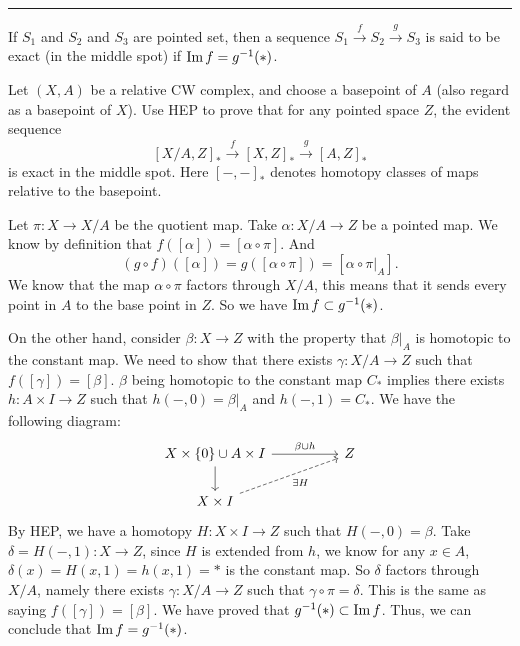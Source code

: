 \documentclass[a4paper, 12pt]{article}
\begin{document}
\noindent\rule{7in}{2.8pt}
\begin{problem}{2}
If \(S_1\) and \(S_2\) and \(S_3\) are pointed set, then a sequence \(S_1\xrightarrow{f}S_2\xrightarrow{g}S_3\) is said to be exact (in the middle spot) if \(\text{Im}\, f=g^{-1}(*)\). 

Let \((X,A)\) be a relative CW complex, and choose a basepoint of \(A\) (also regard as a basepoint of \(X\)). Use HEP to prove that for any pointed space \(Z\), the evident sequence 
\[[X/A,Z]_*\xrightarrow{f} [X,Z]_*\xrightarrow{g} [A,Z]_*\] 
is exact in the middle spot. Here \([-,-]_*\) denotes homotopy classes of maps relative to the basepoint.
\end{problem}
\begin{solution}
Let \(\pi:X\rightarrow X/A\) be the quotient map. Take \(\alpha:X/A\rightarrow Z\) be a pointed map. We know by definition that \(f([\alpha])=[\alpha\circ \pi]\). And 
\[(g\circ f)([\alpha])=g([\alpha\circ \pi])=[\alpha\circ \pi|_A].\]
We know that the map \(\alpha\circ \pi\) factors through \(X/A\), this means that it sends every point in \(A\) to the base point in \(Z\). So we have \(\text{Im}\, f\subset g^{-1}(*)\). 

On the other hand, consider \(\beta:X\rightarrow Z\) with the property that \(\beta|_A\) is homotopic to the constant map. We need to show that there exists \(\gamma:X/A\rightarrow Z\) such that \(f([\gamma])=[\beta]\). \(\beta\) being 
homotopic to the constant map \(C_*\) implies there exists \(h:A\times I\rightarrow Z\) such that \(h(-,0)=\beta|_A\) and \(h(-,1)=C_*\). We have the following diagram:
\[\begin{tikzcd}
	{X\times\left\{0\right\} \cup A\times I } && Z \\
	{X\times I}
	\arrow["{\beta\cup h}", from=1-1, to=1-3]
	\arrow[from=1-1, to=2-1]
	\arrow["{\exists H}"', dashed, from=2-1, to=1-3]
\end{tikzcd}\]
By HEP, we have a homotopy \(H:X\times I\rightarrow Z\) such that \(H(-,0)=\beta\). Take \(\delta=H(-,1):X\rightarrow Z\), since \(H\) is extended from \(h\), we know for any \(x\in A\), \(\delta(x)=H(x,1)=h(x,1)=*\) is the constant map. So 
\(\delta\) factors through \(X/A\), namely there exists \(\gamma:X/A\rightarrow Z\) such that \(\gamma\circ \pi=\delta\). This is the same as saying \(f([\gamma])=[\beta]\). We have proved that 
\(g^{-1}(*)\subset \text{Im}\, f\). Thus, we can conclude that \(\text{Im}\, f=g^{-1}(*)\).
\end{solution}
\end{document}
